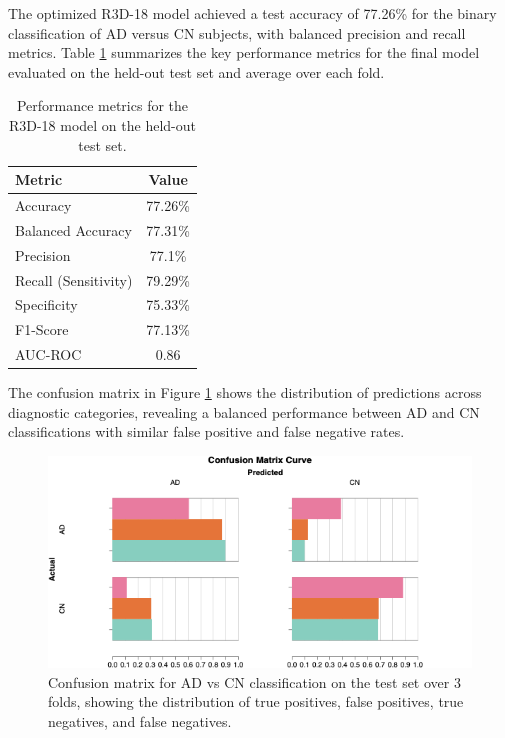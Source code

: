 \documentclass[12pt, a4paper]{article}
\begin{document}
The optimized R3D-18 model achieved a test accuracy of 77.26\% for the binary classification of AD versus CN subjects, with balanced precision and recall metrics. Table \ref{tab:performance_metrics} summarizes the key performance metrics for the final model evaluated on the held-out test set and average over each fold.

\begin{table}[htbp]
\centering
\begin{tabular}{|l|c|}
\hline
\textbf{Metric} & \textbf{Value} \\
\hline
Accuracy & 77.26\% \\
Balanced Accuracy & 77.31\% \\
Precision & 77.1\% \\
Recall (Sensitivity) & 79.29\% \\
Specificity & 75.33\% \\
F1-Score & 77.13\% \\
AUC-ROC & 0.86 \\
\hline
\end{tabular}
\caption{Performance metrics for the R3D-18 model on the held-out test set.}
\label{tab:performance_metrics}
\end{table}

The confusion matrix in Figure \ref{fig:confusion_matrix} shows the distribution of predictions across diagnostic categories, revealing a balanced performance between AD and CN classifications with similar false positive and false negative rates.

\begin{figure}[htbp]
  \centering
  \includegraphics[width=\textwidth]{figures/CM3F.png}
  \caption{Confusion matrix for AD vs CN classification on the test set over 3 folds, showing the distribution of true positives, false positives, true negatives, and false negatives.}
  \label{fig:confusion_matrix}
\end{figure}
\end{document}
